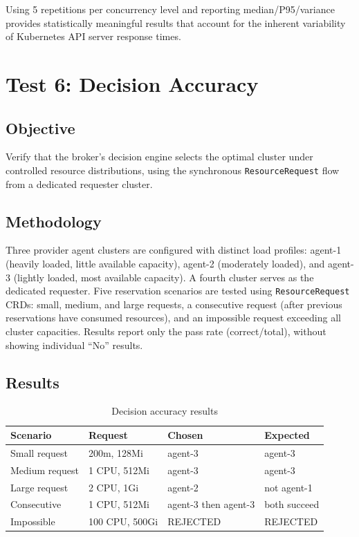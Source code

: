 Using 5 repetitions per concurrency level and reporting median/P95/variance provides statistically meaningful results that account for the inherent variability of Kubernetes API server response times.


\section{Test 6: Decision Accuracy}
\label{sec:test6}

\subsection{Objective}

Verify that the broker's decision engine selects the optimal cluster under controlled resource distributions, using the synchronous \texttt{ResourceRequest} flow from a dedicated requester cluster.

\subsection{Methodology}

Three provider agent clusters are configured with distinct load profiles: agent-1 (heavily loaded, little available capacity), agent-2 (moderately loaded), and agent-3 (lightly loaded, most available capacity). A fourth cluster serves as the dedicated requester. Five reservation scenarios are tested using \texttt{ResourceRequest} CRDs: small, medium, and large requests, a consecutive request (after previous reservations have consumed resources), and an impossible request exceeding all cluster capacities. Results report only the pass rate (correct/total), without showing individual ``No'' results.

\subsection{Results}

\begin{table}[htbp]
\centering
\caption{Decision accuracy results}
\label{tab:test6}
\begin{tabular}{@{}llll@{}}
\toprule
\textbf{Scenario} & \textbf{Request} & \textbf{Chosen} & \textbf{Expected} \\
\midrule
Small request    & 200m, 128Mi  & agent-3  & agent-3 \\
Medium request   & 1 CPU, 512Mi & agent-3  & agent-3 \\
Large request    & 2 CPU, 1Gi   & agent-2  & not agent-1 \\
Consecutive      & 1 CPU, 512Mi & agent-3 then agent-3 & both succeed \\
Impossible       & 100 CPU, 500Gi & REJECTED & REJECTED \\
\bottomrule
\end{tabular}
\end{table}

